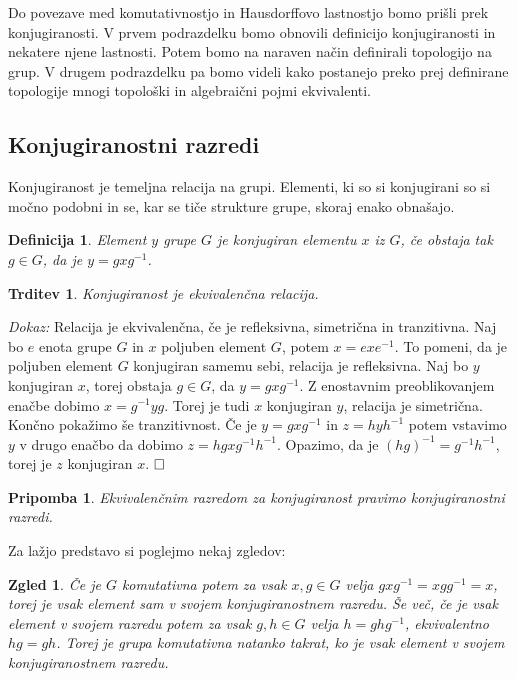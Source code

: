 \documentclass[a4paper,12pt]{article}
\def\qed{$\hfill\Box$}   %
\newtheorem{trditev}{Trditev}
\newtheorem{pripomba}{Pripomba}
\newtheorem{definicija}{Definicija}
\newtheorem{zgled}{Zgled}
\begin{document}
Do povezave med komutativnostjo in Hausdorffovo lastnostjo bomo prišli prek konjugiranosti.
V prvem podrazdelku bomo obnovili definicijo konjugiranosti in nekatere njene lastnosti. Potem bomo na naraven način definirali topologijo na grup.
V drugem podrazdelku pa bomo videli kako postanejo preko prej definirane topologije mnogi topološki in algebraični pojmi ekvivalenti.



\subsection{Konjugiranostni razredi}

Konjugiranost je temeljna relacija na grupi. Elementi, ki so si konjugirani so si močno podobni in se, kar se tiče strukture grupe, skoraj enako obnašajo.

\begin{definicija}
    Element $y$ grupe $G$ je \emph{konjugiran} elementu $x$ iz $G$, če obstaja tak $g \in G$, da je $y = gxg^{-1}$.
\end{definicija}

\begin{trditev}
    Konjugiranost je ekvivalenčna relacija.
\end{trditev}

\noindent
{\em Dokaz:\/}
    Relacija je ekvivalenčna, če je refleksivna, simetrična in tranzitivna. Naj bo $e$ enota grupe $G$ in $x$ poljuben element $G$, potem $x = exe^{-1}$.
    To pomeni, da je poljuben element $G$ konjugiran samemu sebi, relacija je refleksivna.
    Naj bo $y$ konjugiran $x$, torej obstaja $g \in G$, da $y = gxg^{-1}$. Z enostavnim preoblikovanjem enačbe dobimo $x = g^{-1}yg$.
    Torej je tudi $x$ konjugiran $y$, relacija je simetrična.
    Končno pokažimo še tranzitivnost. Če je $y = gxg^{-1}$ in $z = hyh^{-1}$ potem vstavimo $y$ v drugo enačbo da dobimo $z = hgxg^{-1}h^{-1}$.
    Opazimo, da je $(hg)^{-1} = g^{-1}h^{-1}$, torej je $z$ konjugiran $x$.
\qed

\begin{pripomba}
    Ekvivalenčnim razredom za konjugiranost pravimo \emph{konjugiranostni razredi}.
\end{pripomba}

Za lažjo predstavo si poglejmo nekaj zgledov:

\begin{zgled}
        Če je $G$ komutativna potem za vsak $x,g \in G$ velja $gxg^{-1} = xgg^{-1} = x$, torej je vsak element sam v svojem konjugiranostnem razredu.
        Še več, če je vsak element v svojem razredu potem za vsak $g,h \in G$ velja $h = ghg^{-1}$, ekvivalentno $hg = gh$.
        Torej je grupa komutativna natanko takrat, ko je vsak element v svojem konjugiranostnem razredu.
\end{zgled}
\end{document}
